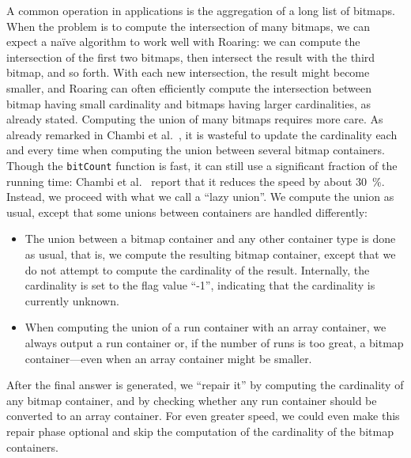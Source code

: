 \documentclass[times]{speauth}
\begin{document}
A common operation in applications is the aggregation of a long list of bitmaps. When the problem is to compute the intersection of many bitmaps, we can expect a na\"ive algorithm to work well with Roaring: we can  compute the intersection of the first two bitmaps, then intersect the result with the third bitmap, and so forth.
With each new intersection, the result might become smaller, and Roaring
can often efficiently compute the intersection between bitmap having small cardinality and bitmaps having larger cardinalities, as already stated.
Computing the union of many bitmaps requires more care. As already remarked in Chambi et al.~\cite{SPE:SPE2325}, it is wasteful to update the cardinality each and every time when computing the union between several bitmap containers. Though the \texttt{bitCount} function is fast, it can still use a significant fraction of the running time: Chambi et al.~\cite{SPE:SPE2325} report that it reduces the speed by about \SI{30}{\percent}. Instead, we proceed with what we call a ``lazy union''. We compute the union as usual, except that some
unions between containers are handled differently:
\begin{itemize}
\item The union between a bitmap container and any other container type is done as usual, that is, we compute the resulting bitmap container, except that we do not attempt to compute the cardinality of the result. Internally, the cardinality is set to the flag value ``-1'', indicating that the cardinality is currently unknown.
\item When computing the union of a run container with an array container, we always output a run container or, if the number of runs is too great, a bitmap container---even when an array container might be smaller.
\end{itemize}
After the final answer is generated, we ``repair it'' by computing the cardinality of any bitmap container, and by checking whether any run container should be converted to an array container. For even greater speed, we could even make this repair phase optional and skip the computation of the cardinality of the bitmap containers.
\end{document}
